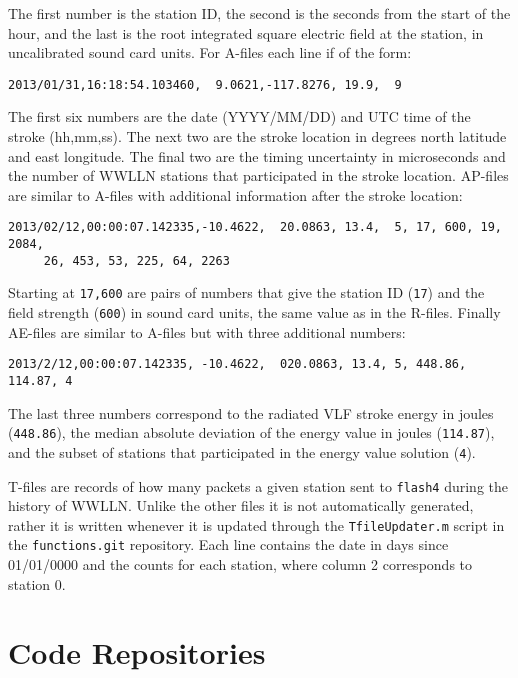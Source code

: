 The first number is the station ID, the second is the seconds from the start of the hour, and the last is the root integrated square electric field at the station, in uncalibrated sound card units.
For A-files each line if of the form:

\begin{verbatim}
2013/01/31,16:18:54.103460,  9.0621,-117.8276, 19.9,  9
\end{verbatim}

The first six numbers are the date (YYYY/MM/DD) and UTC time of the stroke (hh,mm,ss).
The next two are the stroke location in degrees north latitude and east longitude.
The final two are the timing uncertainty in microseconds and the number of WWLLN stations that participated in the stroke location.
AP-files are similar to A-files with additional information after the stroke location:

\begin{verbatim}
2013/02/12,00:00:07.142335,-10.4622,  20.0863, 13.4,  5, 17, 600, 19, 2084,
	 26, 453, 53, 225, 64, 2263
\end{verbatim}

Starting at \texttt{17,600} are pairs of numbers that give the station ID (\texttt{17}) and the field strength (\texttt{600}) in sound card units, the same value as in the R-files. Finally AE-files are similar to A-files but with three additional numbers:

\begin{verbatim}
2013/2/12,00:00:07.142335, -10.4622,  020.0863, 13.4, 5, 448.86, 114.87, 4
\end{verbatim}

The last three numbers correspond to the radiated VLF stroke energy in joules (\texttt{448.86}), the median absolute deviation of the energy value in joules (\texttt{114.87}), and the subset of stations that participated in the energy value solution (\texttt{4}).

T-files are records of how many packets a given station sent to \texttt{flash4} during the history of WWLLN.
Unlike the other files it is not automatically generated, rather it is written whenever it is updated through the \texttt{TfileUpdater.m} script in the \texttt{functions.git} repository.
Each line contains the date in days since 01/01/0000 and the counts for each station, where column 2 corresponds to station 0.

\section{Code Repositories}

